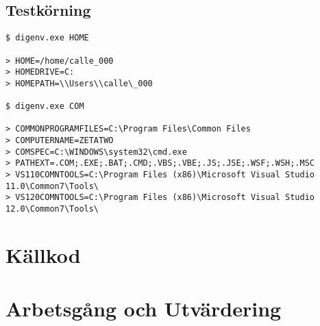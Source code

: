 \documentclass[10pt,a4paper]{article}
\begin{document}
\subsection{Testkörning}

\begin{lstlisting}
$ digenv.exe HOME

> HOME=/home/calle_000
> HOMEDRIVE=C:
> HOMEPATH=\\Users\\calle\_000

$ digenv.exe COM

> COMMONPROGRAMFILES=C:\Program Files\Common Files
> COMPUTERNAME=ZETATWO
> COMSPEC=C:\WINDOWS\system32\cmd.exe
> PATHEXT=.COM;.EXE;.BAT;.CMD;.VBS;.VBE;.JS;.JSE;.WSF;.WSH;.MSC
> VS110COMNTOOLS=C:\Program Files (x86)\Microsoft Visual Studio 11.0\Common7\Tools\
> VS120COMNTOOLS=C:\Program Files (x86)\Microsoft Visual Studio 12.0\Common7\Tools\
\end{lstlisting}


\clearpage
\section{Källkod}

\clearpage

\section{Arbetsgång och Utvärdering}
\end{document}
